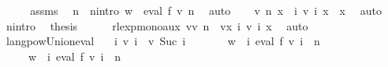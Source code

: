 \begin{isabellebody}
%
\isadelimproof
%
\endisadelimproof
%
\isatagproof
{}\isamarkupfalse%
\ {\isacharminus}{\kern0pt}\isanewline
\ \ \isamarkupfalse%
\ assms{\isacharparenleft}{\kern0pt}{}{\isacharparenright}{\kern0pt}\ \isamarkupfalse%
\ n\ \ n{\isacharunderscore}{\kern0pt}intro{\isacharcolon}{\kern0pt}\ {\isachardoublequoteopen}w\ {\isasymin}\ eval\ f\ {\isacharparenleft}{\kern0pt}v\ n{\isacharparenright}{\kern0pt}{\isachardoublequoteclose}\ \isamarkupfalse%
\ auto\isanewline
\ \ \isamarkupfalse%
\ {\isachardoublequoteopen}v\ n\ x\ {\isasymsubseteq}\ {\isacharparenleft}{\kern0pt}{\isasymUnion}i{\isachardot}{\kern0pt}\ v\ i\ x{\isacharparenright}{\kern0pt}{\isachardoublequoteclose}\ \ x\ \isamarkupfalse%
\ auto\isanewline
\ \ \isamarkupfalse%
\ n{\isacharunderscore}{\kern0pt}intro\ \isamarkupfalse%
\ {\isachardoublequoteopen}{\isacharquery}{\kern0pt}thesis{\isachardoublequoteclose}\isanewline
\ \ \ \ \isamarkupfalse%
\ rlexp{\isacharunderscore}{\kern0pt}mono{\isacharunderscore}{\kern0pt}aux{\isacharbrackleft}{\kern0pt}\ v{\isacharequal}{\kern0pt}{\isachardoublequoteopen}v\ n{\isachardoublequoteclose}\ \ v{\isacharprime}{\kern0pt}{\isacharequal}{\kern0pt}{\isachardoublequoteopen}{\isasymlambda}x{\isachardot}{\kern0pt}\ {\isasymUnion}i{\isachardot}{\kern0pt}\ v\ i\ x{\isachardoublequoteclose}{\isacharbrackright}{\kern0pt}\ \isamarkupfalse%
\ auto\isanewline
{}\isamarkupfalse%
%
\endisatagproof
{\isafoldproof}%
%
\isadelimproof
\isanewline
%
\endisadelimproof
\isanewline
{}\isamarkupfalse%
\ langpow{\isacharunderscore}{\kern0pt}Union{\isacharunderscore}{\kern0pt}eval{\isacharcolon}{\kern0pt}\isanewline
\ \ \ {\isachardoublequoteopen}{\isasymforall}i{\isachardot}{\kern0pt}\ v\ i\ {\isasymle}\ v\ {\isacharparenleft}{\kern0pt}Suc\ i{\isacharparenright}{\kern0pt}{\isachardoublequoteclose}\isanewline
\ \ \ \ \ \ \ {\isachardoublequoteopen}w\ {\isasymin}\ {\isacharparenleft}{\kern0pt}{\isasymUnion}i{\isachardot}{\kern0pt}\ eval\ f\ {\isacharparenleft}{\kern0pt}v\ i{\isacharparenright}{\kern0pt}{\isacharparenright}{\kern0pt}\ {\isacharcircum}{\kern0pt}{\isacharcircum}{\kern0pt}\ n{\isachardoublequoteclose}\isanewline
\ \ \ \ \ {\isachardoublequoteopen}w\ {\isasymin}\ {\isacharparenleft}{\kern0pt}{\isasymUnion}i{\isachardot}{\kern0pt}\ eval\ f\ {\isacharparenleft}{\kern0pt}v\ i{\isacharparenright}{\kern0pt}\ {\isacharcircum}{\kern0pt}{\isacharcircum}{\kern0pt}\ n{\isacharparenright}{\kern0pt}{\isachardoublequoteclose}\isanewline

\end{isabellebody}

